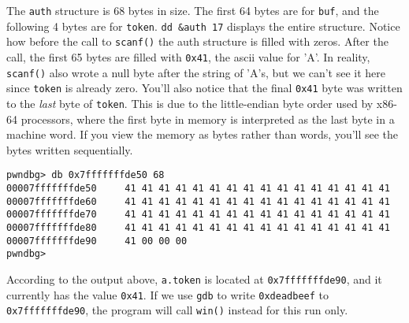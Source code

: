 The \texttt{auth} structure is 68 bytes in size. The first 64 bytes are for
\texttt{buf}, and the following 4 bytes are for \texttt{token}. \texttt{dd
\&auth 17} displays the entire structure. Notice how before the call to
\texttt{scanf()} the auth structure is filled with zeros. After the call, the
first 65 bytes are filled with \texttt{0x41}, the ascii value for 'A'. In
reality, \texttt{scanf()} also wrote a null byte after the string of 'A's, but
we can't see it here since \texttt{token} is already zero. You'll also notice
that the final \texttt{0x41} byte was written to the \emph{last} byte of
\texttt{token}. This is due to the little-endian byte order used by x86-64
processors, where the first byte in memory is interpreted as the last byte in a
machine word. If you view the memory as bytes rather than words, you'll see the
bytes written sequentially.

\begin{lstlisting}
pwndbg> db 0x7fffffffde50 68
00007fffffffde50     41 41 41 41 41 41 41 41 41 41 41 41 41 41 41 41
00007fffffffde60     41 41 41 41 41 41 41 41 41 41 41 41 41 41 41 41
00007fffffffde70     41 41 41 41 41 41 41 41 41 41 41 41 41 41 41 41
00007fffffffde80     41 41 41 41 41 41 41 41 41 41 41 41 41 41 41 41
00007fffffffde90     41 00 00 00
pwndbg> 
\end{lstlisting}

According to the output above, \texttt{a.token} is located at
\texttt{0x7fffffffde90}, and it currently has the value \texttt{0x41}. If we use
\texttt{gdb} to write \texttt{0xdeadbeef} to \texttt{0x7fffffffde90}, the
program will call \texttt{win()} instead for this run only.

